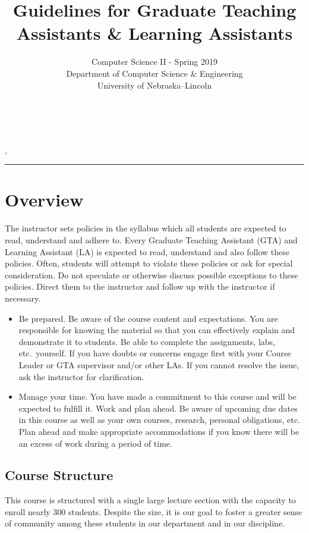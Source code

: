 \documentclass[12pt]{scrartcl}
\title{Guidelines for Graduate Teaching Assistants \& Learning Assistants}\let\Title\@title
\subtitle{Computer Science II - Spring 2019\\
{\small
\vskip1cm
Department of Computer Science \& Engineering \\
University of Nebraska--Lincoln}
\vskip-1cm}
\date{~}
\begin{document}
\maketitle

\newwatermark[allpages=true,scale=5,textmark=Draft]{},

\hrule

\section*{Overview}

The instructor sets policies in the syllabus which all students 
are expected to read, understand and adhere to. Every Graduate 
Teaching Assistant (GTA) and Learning Assistant (LA) is expected 
to read, understand and also follow these policies.  Often, 
students will attempt to violate these policies or ask for special 
consideration.  Do not speculate or otherwise discuss possible 
exceptions to these policies.  Direct them to the instructor 
and follow up with the instructor if necessary.

\begin{itemize}
  \item Be prepared.  Be aware of the course content and expectations.
  You are responsible for knowing the material so that you can effectively
  explain and demonstrate it to students.  Be able to complete the assignments, 
  labs, etc.\ yourself.  If you have doubts or concerns engage first with
  your Course Leader or GTA supervisor and/or other LAs.  If you cannot
  resolve the issue, ask the instructor for clarification.
  \item Manage your time.  You have made a commitment to this course and
  will be expected to fulfill it.  Work and plan ahead.  Be aware of 
  upcoming due dates in this course as well as your own courses, research, 
  personal obligations, etc.  Plan ahead and make appropriate accommodations 
  if you know there will be an excess of work during a period of time.
\end{itemize}

\subsection*{Course Structure}

This course is structured with a single large lecture section with the
capacity to enroll nearly 300 students.  Despite the size, it is our 
goal to foster a greater sense of community among these students in 
our department and in our discipline.  
\end{document}

